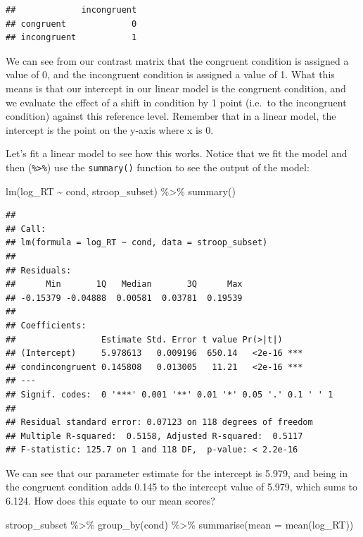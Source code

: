 \documentclass[
]{book}
\newenvironment{Shaded}{\begin{snugshade}}{\end{snugshade}}
\newcommand{\AttributeTok}[1]{\textcolor[rgb]{0.77,0.63,0.00}{#1}}
\newcommand{\FunctionTok}[1]{\textcolor[rgb]{0.00,0.00,0.00}{#1}}
\newcommand{\NormalTok}[1]{#1}
\newcommand{\SpecialCharTok}[1]{\textcolor[rgb]{0.00,0.00,0.00}{#1}}
\begin{document}
\begin{verbatim}
##             incongruent
## congruent             0
## incongruent           1
\end{verbatim}

We can see from our contrast matrix that the congruent condition is assigned a value of 0, and the incongruent condition is assigned a value of 1. What this means is that our intercept in our linear model is the congruent condition, and we evaluate the effect of a shift in condition by 1 point (i.e.~to the incongruent condition) against this reference level. Remember that in a linear model, the intercept is the point on the y-axis where x is 0.

Let's fit a linear model to see how this works. Notice that we fit the model and then (\texttt{\%\textgreater{}\%}) use the \texttt{summary()} function to see the output of the model:

\begin{Shaded}
\begin{Highlighting}[]
\FunctionTok{lm}\NormalTok{(log\_RT }\SpecialCharTok{\textasciitilde{}}\NormalTok{ cond, stroop\_subset) }\SpecialCharTok{\%\textgreater{}\%} \FunctionTok{summary}\NormalTok{()}
\end{Highlighting}
\end{Shaded}

\begin{verbatim}
## 
## Call:
## lm(formula = log_RT ~ cond, data = stroop_subset)
## 
## Residuals:
##      Min       1Q   Median       3Q      Max 
## -0.15379 -0.04888  0.00581  0.03781  0.19539 
## 
## Coefficients:
##                 Estimate Std. Error t value Pr(>|t|)    
## (Intercept)     5.978613   0.009196  650.14   <2e-16 ***
## condincongruent 0.145808   0.013005   11.21   <2e-16 ***
## ---
## Signif. codes:  0 '***' 0.001 '**' 0.01 '*' 0.05 '.' 0.1 ' ' 1
## 
## Residual standard error: 0.07123 on 118 degrees of freedom
## Multiple R-squared:  0.5158, Adjusted R-squared:  0.5117 
## F-statistic: 125.7 on 1 and 118 DF,  p-value: < 2.2e-16
\end{verbatim}

We can see that our parameter estimate for the intercept is 5.979, and being in the congruent condition adds 0.145 to the intercept value of 5.979, which sums to 6.124. How does this equate to our mean scores?

\begin{Shaded}
\begin{Highlighting}[]
\NormalTok{stroop\_subset }\SpecialCharTok{\%\textgreater{}\%} 
  \FunctionTok{group\_by}\NormalTok{(cond) }\SpecialCharTok{\%\textgreater{}\%} 
  \FunctionTok{summarise}\NormalTok{(}\AttributeTok{mean =} \FunctionTok{mean}\NormalTok{(log\_RT))}
\end{Highlighting}
\end{Shaded}
\end{document}
